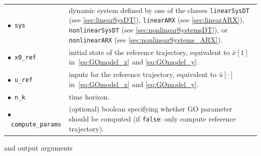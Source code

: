 \begin{center}
\renewcommand{\arraystretch}{1.3}
\begin{tabular}[t]{l p{12.4cm} }
	$\bullet$~\texttt{sys} & dynamic system defined by one of the classes \texttt{linearSysDT} (see \cref{sec:linearSysDT}), \texttt{linearARX} (see \cref{sec:linearARX}), \texttt{nonlinearSysDT} (see \cref{sec:nonlinearSystemsDT}), or \texttt{nonlinearARX} (see \cref{sec:nonlinearSystems_ARX}). \\
	$\bullet$~\texttt{x0\_ref} & initial state of the reference trajectory, equivalent to $\bar{x}[1]$ in~\eqref{eq:GOmodel_x} and \eqref{eq:GOmodel_y}. \\
	$\bullet$~\texttt{u\_ref} & inputs for the reference trajectory, equivalent to $\bar{u}[\cdot]$ in~\eqref{eq:GOmodel_x} and \eqref{eq:GOmodel_y}. \\
	$\bullet$~\texttt{n\_k} & time horizon. \\
	$\bullet$~\texttt{compute\_params} & (optional) boolean specifying whether GO parameter should be computed (if \texttt{false}: only compute reference trajectory). 
\end{tabular}
\end{center}

and output arguments

